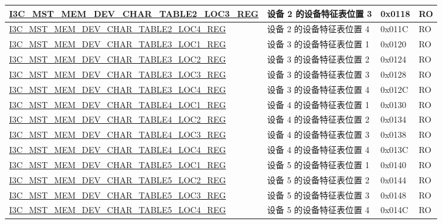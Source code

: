 \begin{longtable}{ | p{8cm} | p{5.5cm} | p{1.3cm} | p{1cm} | }
\hyperref[regdesc:I3CMSTMEMDEVCHARTABLENLOCMREG]{I3C\_MST\_MEM\_DEV\_CHAR\_TABLE2\_LOC3\_REG} & 设备 2 的设备特征表位置 3 & 0x0118 & RO \\ \hline
\hyperref[regdesc:I3CMSTMEMDEVCHARTABLENLOCMREG]{I3C\_MST\_MEM\_DEV\_CHAR\_TABLE2\_LOC4\_REG} & 设备 2 的设备特征表位置 4 & 0x011C & RO \\ \hline
\hyperref[regdesc:I3CMSTMEMDEVCHARTABLENLOCMREG]{I3C\_MST\_MEM\_DEV\_CHAR\_TABLE3\_LOC1\_REG} & 设备 3 的设备特征表位置 1 & 0x0120 & RO \\ \hline
\hyperref[regdesc:I3CMSTMEMDEVCHARTABLENLOCMREG]{I3C\_MST\_MEM\_DEV\_CHAR\_TABLE3\_LOC2\_REG} & 设备 3 的设备特征表位置 2 & 0x0124 & RO \\ \hline
\hyperref[regdesc:I3CMSTMEMDEVCHARTABLENLOCMREG]{I3C\_MST\_MEM\_DEV\_CHAR\_TABLE3\_LOC3\_REG} & 设备 3 的设备特征表位置 3 & 0x0128 & RO \\ \hline
\hyperref[regdesc:I3CMSTMEMDEVCHARTABLENLOCMREG]{I3C\_MST\_MEM\_DEV\_CHAR\_TABLE3\_LOC4\_REG} & 设备 3 的设备特征表位置 4 & 0x012C & RO \\ \hline
\hyperref[regdesc:I3CMSTMEMDEVCHARTABLENLOCMREG]{I3C\_MST\_MEM\_DEV\_CHAR\_TABLE4\_LOC1\_REG} & 设备 4 的设备特征表位置 1 & 0x0130 & RO \\ \hline
\hyperref[regdesc:I3CMSTMEMDEVCHARTABLENLOCMREG]{I3C\_MST\_MEM\_DEV\_CHAR\_TABLE4\_LOC2\_REG} & 设备 4 的设备特征表位置 2 & 0x0134 & RO \\ \hline
\hyperref[regdesc:I3CMSTMEMDEVCHARTABLENLOCMREG]{I3C\_MST\_MEM\_DEV\_CHAR\_TABLE4\_LOC3\_REG} & 设备 4 的设备特征表位置 3 & 0x0138 & RO \\ \hline
\hyperref[regdesc:I3CMSTMEMDEVCHARTABLENLOCMREG]{I3C\_MST\_MEM\_DEV\_CHAR\_TABLE4\_LOC4\_REG} & 设备 4 的设备特征表位置 4 & 0x013C & RO \\ \hline
\hyperref[regdesc:I3CMSTMEMDEVCHARTABLENLOCMREG]{I3C\_MST\_MEM\_DEV\_CHAR\_TABLE5\_LOC1\_REG} & 设备 5 的设备特征表位置 1 & 0x0140 & RO \\ \hline
\hyperref[regdesc:I3CMSTMEMDEVCHARTABLENLOCMREG]{I3C\_MST\_MEM\_DEV\_CHAR\_TABLE5\_LOC2\_REG} & 设备 5 的设备特征表位置 2 & 0x0144 & RO \\ \hline
\hyperref[regdesc:I3CMSTMEMDEVCHARTABLENLOCMREG]{I3C\_MST\_MEM\_DEV\_CHAR\_TABLE5\_LOC3\_REG} & 设备 5 的设备特征表位置 3 & 0x0148 & RO \\ \hline
\hyperref[regdesc:I3CMSTMEMDEVCHARTABLENLOCMREG]{I3C\_MST\_MEM\_DEV\_CHAR\_TABLE5\_LOC4\_REG} & 设备 5 的设备特征表位置 4 & 0x014C & RO \\ \hline

\end{longtable}
